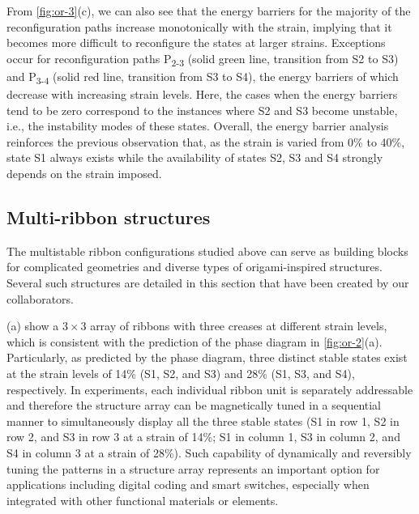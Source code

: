From \cref{fig:or-3}(c), we can also see that the energy barriers for the majority of the reconfiguration paths increase monotonically with the strain, implying that it becomes more difficult to reconfigure the states at larger strains.
Exceptions occur for reconfiguration paths P\textsubscript{2-3} (solid green line, transition from S2 to S3) and P\textsubscript{3-4} (solid red line, transition from S3 to S4), the energy barriers of which decrease with increasing strain levels.
Here, the cases when the energy barriers tend to be zero correspond to the instances where S2 and S3 become unstable, i.e., the instability modes of these states.
Overall, the energy barrier analysis reinforces the previous observation that, as the strain is varied from 0\% to 40\%, state S1 always exists while the availability of states S2, S3 and S4 strongly depends on the strain imposed.


\subsection{Multi-ribbon structures}\label{sec:or-structures}

The multistable ribbon configurations studied above can serve as building blocks for complicated geometries and diverse types of origami-inspired structures.
Several such structures are detailed in this section that have been created by our collaborators.

(a) show a $3\times3$ array of ribbons with three creases at different strain levels, which is consistent with the prediction of the phase diagram in \cref{fig:or-2}(a).
Particularly, as predicted by the phase diagram, three distinct stable states exist at the strain levels of 14\% (S1, S2, and S3) and 28\% (S1, S3, and S4), respectively.
In experiments, each individual ribbon unit is separately addressable and therefore the structure array can be magnetically tuned in a sequential manner to simultaneously display all the three stable states (S1 in row 1, S2 in row 2, and S3 in row 3 at a strain of 14\%; S1 in column 1, S3 in column 2, and S4 in column 3 at a strain of 28\%).
Such capability of dynamically and reversibly tuning the patterns in a structure array represents an important option for applications including digital coding and smart switches\cite{Chen2021}, especially when integrated with other functional materials or elements.

